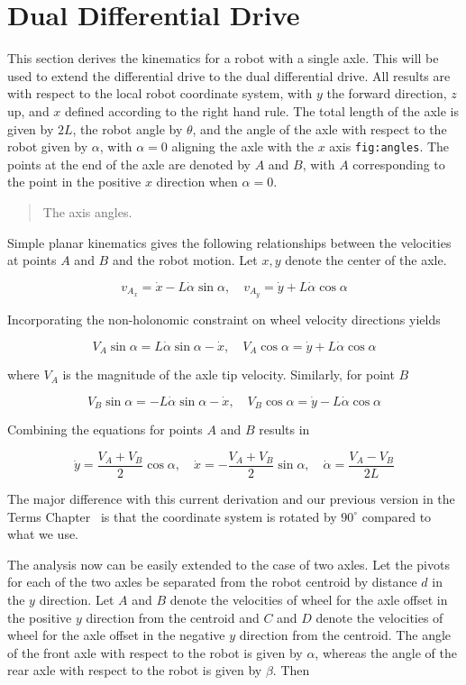 \hypertarget{dual-differential-drive}{%
\section{Dual Differential Drive}\label{dual-differential-drive}}

This section derives the kinematics for a robot with a single axle. This
will be used to extend the differential drive to the dual differential
drive. All results are with respect to the local robot coordinate
system, with \(y\) the forward direction, \(z\) up, and \(x\) defined
according to the right hand rule. The total length of the axle is given
by \(2L\), the robot angle by \(\theta\), and the angle of the axle with
respect to the robot given by \(\alpha\), with \(\alpha=0\) aligning the
axle with the \(x\) axis \texttt{fig:angles}. The points at the end of
the axle are denoted by \(A\) and \(B\), with \(A\) corresponding to the
point in the positive \(x\) direction when \(\alpha=0\).

\begin{quote}
The axis angles.
\end{quote}

Simple planar kinematics gives the following relationships between the
velocities at points \(A\) and \(B\) and the robot motion. Let \(x,y\)
denote the center of the axle.

\[v_{A_x} = \dot{x}-L\dot{\alpha}\sin\alpha, \quad
v_{A_y} = \dot{y}+L\dot{\alpha}\cos\alpha\]

Incorporating the non-holonomic constraint on wheel velocity directions
yields

\[V_A\sin\alpha = L\dot{\alpha}\sin\alpha-\dot{x}, \quad
V_A\cos\alpha = \dot{y}+L\dot{\alpha}\cos\alpha\]

where \(V_A\) is the magnitude of the axle tip velocity. Similarly, for
point \(B\)

\[V_B\sin\alpha = -L\dot{\alpha}\sin\alpha-\dot{x}, \quad
V_B\cos\alpha = \dot{y}-L\dot{\alpha}\cos\alpha\]

Combining the equations for points \(A\) and \(B\) results in

\[\dot{y} = \frac{V_A+V_B}{2}\cos\alpha, \quad
\dot{x} = -\frac{V_A+V_B}{2}\sin\alpha, \quad
\dot{\alpha} = \frac{V_A-V_B}{2L}\]

The major difference with this current derivation and our previous
version in the Terms Chapter~ is that the coordinate system is rotated
by \(90^\circ\) compared to what we use.

The analysis now can be easily extended to the case of two axles. Let
the pivots for each of the two axles be separated from the robot
centroid by distance \(d\) in the \(y\) direction. Let \(A\) and \(B\)
denote the velocities of wheel for the axle offset in the positive \(y\)
direction from the centroid and \(C\) and \(D\) denote the velocities of
wheel for the axle offset in the negative \(y\) direction from the
centroid. The angle of the front axle with respect to the robot is given
by \(\alpha\), whereas the angle of the rear axle with respect to the
robot is given by \(\beta\). Then


